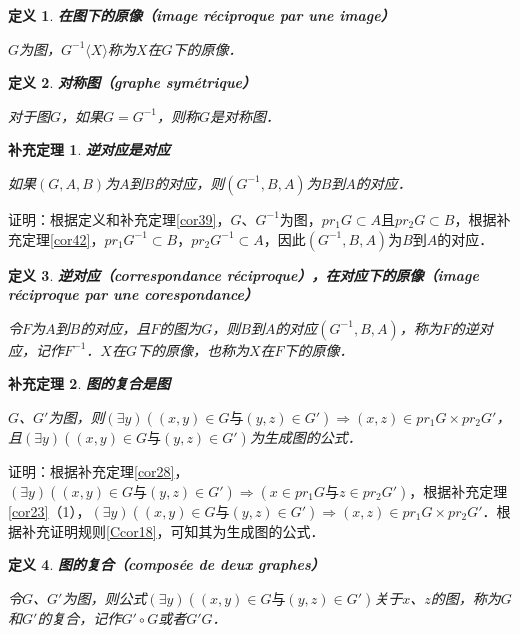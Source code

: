 \documentclass[12pt, a4paper, oneside]{book}
\newtheorem{cor}{补充定理}
\newtheorem{de}{定义}
\begin{document}
			\begin{de}
				\textbf{在图下的原像（image réciproque par une image）}
				\par
				$G$为图，$G^{-1}\langle X \rangle $称为$X$在$G$下的原像．
			\end{de}

			\begin{de}
				\textbf{对称图（graphe symétrique）}
				\par
				对于图$G$，如果$G=G^{-1}$，则称$G$是对称图．
			\end{de}
			
			\begin{cor}\label{cor46}
				\textbf{逆对应是对应}
				\par
				如果$(G, A, B)$为$A$到$B$的对应，则$(G^{-1}, B, A)$为$B$到$A$的对应．
			\end{cor}
			证明：根据定义和补充定理\ref{cor39}，$G$、$G^{-1}$为图，$pr_1G\subset A且pr_2G\subset B$，根据补充定理\ref{cor42}，$pr_1G^{-1}\subset B$，$pr_2G^{-1}\subset A$，因此$(G^{-1}, B, A)$为$B$到$A$的对应．

			\begin{de}
				\textbf{逆对应（correspondance réciproque），在对应下的原像（image réciproque par une corespondance）}
				\par
				令$F$为$A$到$B$的对应，且$F$的图为$G$，则$B$到$A$的对应$(G^{-1}, B, A)$，称为$F$的逆对应，记作$F^{-1}$．$X$在$G$下的原像，也称为$X$在$F$下的原像．
			\end{de}

			\begin{cor}\label{cor47}
				\textbf{图的复合是图}
				\par
				$G$、$G'$为图，则$(\exists y)((x, y)\in G\text{与}(y, z)\in G')\Rightarrow (x, z)\in pr_1G\times pr_2G'$，且$(\exists y)((x, y)\in G\text{与}(y, z)\in G')$为生成图的公式．
			\end{cor}
			证明：根据补充定理\ref{cor28}，$(\exists y)((x, y)\in G\text{与}(y, z)\in G')\Rightarrow (x\in pr_1G\text{与}z\in pr_2G')$，根据补充定理\ref{cor23}（1），$(\exists y)((x, y)\in G\text{与}(y, z)\in G')\Rightarrow (x, z)\in pr_1G\times pr_2G'$．根据补充证明规则\ref{Ccor18}，可知其为生成图的公式．

			\begin{de}
				\textbf{图的复合（composée de deux graphes）}
				\par
				令$G$、$G'$为图，则公式$(\exists y)((x, y)\in G\text{与}(y, z)\in G')$关于$x$、$z$的图，称为$G$和$G'$的复合，记作$G'\circ G$或者$G'G$．
			\end{de}
\end{document}
